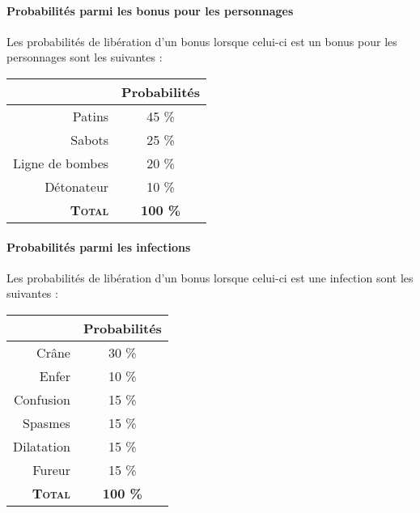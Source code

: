 \paragraph{Probabilités parmi les bonus pour les personnages}
Les probabilités de libération d'un bonus lorsque celui-ci est un bonus pour les personnages sont les suivantes :
\begin{center}
\begin{tabular}{|r|c|}
\hline 
& Probabilités \\ 
\hline 
Patins & 45 \% \\ 
\hline 
Sabots & 25 \% \\ 
\hline 
Ligne de bombes & 20 \% \\ 
\hline 
Détonateur & 10 \% \\ 
\hline 
\textbf{\textsc{Total}} & \textbf{100 \%} \\ 
\hline 
\end{tabular} 
\end{center}

\paragraph{Probabilités parmi les infections}
Les probabilités de libération d'un bonus lorsque celui-ci est une infection sont les suivantes :
\begin{center}
\begin{tabular}{|r|c|}
\hline 
& Probabilités \\ 
\hline 
Crâne & 30 \% \\ 
\hline 
Enfer & 10 \% \\ 
\hline 
Confusion & 15 \% \\ 
\hline 
Spasmes & 15 \% \\ 
\hline 
Dilatation & 15 \% \\ 
\hline 
Fureur & 15 \% \\ 
\hline 
\textbf{\textsc{Total}} & \textbf{100 \%} \\ 
\hline 
\end{tabular} 
\end{center}